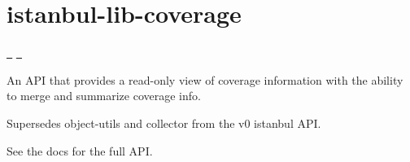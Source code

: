 \chapter{istanbul-\/lib-\/coverage}
\hypertarget{md_pkiclassroomrescheduler_2src_2main_2frontend_2node__modules_2istanbul-lib-coverage_2_r_e_a_d_m_e}{}\label{md_pkiclassroomrescheduler_2src_2main_2frontend_2node__modules_2istanbul-lib-coverage_2_r_e_a_d_m_e}
\label{md_pkiclassroomrescheduler_2src_2main_2frontend_2node__modules_2istanbul-lib-coverage_2_r_e_a_d_m_e_autotoc_md14943}%
%
 \href{https://greenkeeper.io/}{\texttt{ }} \href{https://travis-ci.org/istanbuljs/istanbul-lib-coverage}{\texttt{ }}

An API that provides a read-\/only view of coverage information with the ability to merge and summarize coverage info.

Supersedes {\ttfamily object-\/utils} and {\ttfamily collector} from the v0 istanbul API.

See the docs for the full API.


\begin{DoxyCode}{0}
\DoxyCodeLine{}
\DoxyCodeLine{}
\DoxyCodeLine{\});}
\DoxyCodeLine{}

\end{DoxyCode}
 